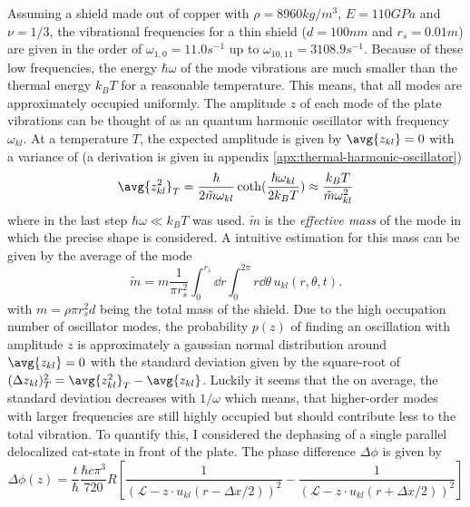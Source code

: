 Assuming a shield made out of copper with $\rho = 8960\si{kg/m^3}$, $E = 110\si{GPa}$ and $\nu = 1/3$, the vibrational frequencies for a thin shield ($d = 100\si{nm}$ and $r_s = 0.01\si{m}$) are given in the order of $\omega_{1,0}=11.0\si{s^{-1}}$ up to $\omega_{10,11} = 3108.9\si{s^{-1}}$.
Because of these low frequencies, the energy $\hbar \omega$ of the mode vibrations are much smaller than the thermal energy $k_B T$ for a reasonable temperature. This means, that all modes are approximately occupied uniformly.
The amplitude $z$ of each mode of the plate vibrations can be thought of as an quantum harmonic oscillator with frequency $\omega_{kl}$. At a temperature $T$, the expected amplitude is given by $\avg{z_{kl}} = 0$ with a variance of (a derivation is given in appendix \ref{apx:thermal-harmonic-oscillator})
\begin{equation}\label{eq:5:amplitude-variance}
  \avg{z_{kl}^2}_T = \frac{\hbar}{2\tilde{m}\omega_{kl}}\coth(\frac{\hbar \omega_{kl}}{2k_BT}) \approx \frac{k_B T}{\tilde{m}\omega_{kl}^2}
\end{equation}
where in the last step $\hbar\omega \ll k_B T$ was used. $\tilde{m}$ is the \textit{effective mass} of the mode in which the precise shape is considered. A intuitive estimation for this mass can be given by the average of the mode 
\begin{equation}\label{eq:5:effective-mass}
  \tilde{m} = m\frac{1}{\pi r_s^2}\int_0^{r_s} \dd r \int_0^{2\pi} r\dd\theta \, u_{kl}(r, \theta, t) .
\end{equation}
with $m=\rho \pi r_s^2 d$ being the total mass of the shield.
Due to the high occupation number of oscillator modes, the probability $p(z)$ of finding an oscillation with amplitude $z$ is approximately a gaussian normal distribution around $\avg{z_{kl}} = 0$ with the standard deviation given by the square-root of $(\Delta z_{kl})_T^2 = \avg{z_{kl}^2}_T - \avg{z_{kl}}$.
Luckily it seems that the on average, the standard deviation decreases with $1/\omega$ which means, that higher-order modes with larger frequencies are still highly occupied but should contribute less to the total vibration.
To quantify this, I considered the dephasing of a single parallel delocalized cat-state in front of the plate. The phase difference $\Delta \phi$ is given by
\begin{equation}\label{eq:5:phase-difference}
  \Delta\phi(z) = \frac{t}{\hbar} \frac{\hbar c \pi^3}{720} R \left[\frac{1}{(\mathscr{L}-z \cdot u_{kl}(r- \Delta x/2))^2} - \frac{1}{(\mathscr{L}-z \cdot u_{kl}(r + \Delta x/2))^2} \right]
\end{equation}
